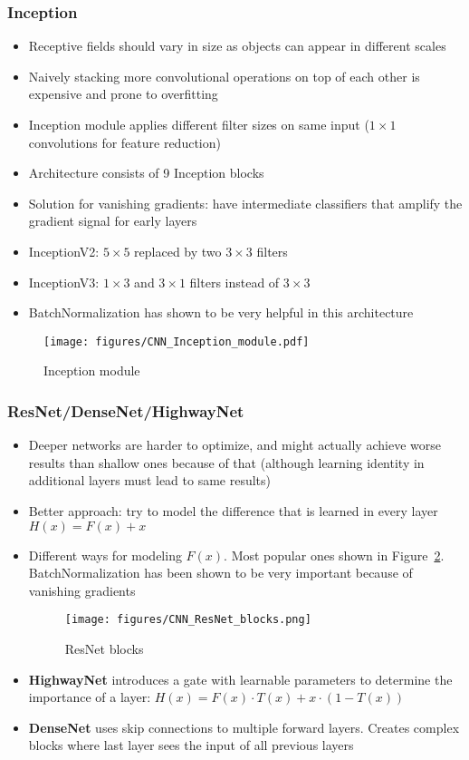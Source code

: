 \subsubsection{Inception}
\begin{itemize}
	\item Receptive fields should vary in size as objects can appear in different scales
	\item Naively stacking more convolutional operations on top of each other is expensive and prone to overfitting
	\item Inception module applies different filter sizes on same input ($1\times 1$ convolutions for feature reduction)
	\item Architecture consists of 9 Inception blocks
	\item Solution for vanishing gradients: have intermediate classifiers that amplify the gradient signal for early layers
	\item InceptionV2: $5\times 5$ replaced by two $3\times 3$ filters
	\item InceptionV3: $1\times 3$ and $3\times 1$ filters instead of $3\times 3$
	\item BatchNormalization has shown to be very helpful in this architecture
\end{itemize}
\begin{figure}[ht!]
	\centering
	\texttt{[image: figures/CNN\_Inception\_module.pdf]}
	\caption{Inception module}
	\label{fig:CNN_Inception_module}
\end{figure}
\subsubsection{ResNet/DenseNet/HighwayNet}
\begin{itemize}
	\item Deeper networks are harder to optimize, and might actually achieve worse results than shallow ones because of that (although learning identity in additional layers must lead to same results)
	\item Better approach: try to model the difference that is learned in every layer $H(x) = F(x) + x$
	\item Different ways for modeling $F(x)$. Most popular ones shown in Figure~\ref{fig:CNN_ResNet_blocks}. BatchNormalization has been shown to be very important because of vanishing gradients
	\begin{figure}[ht!]
		\centering
		\texttt{[image: figures/CNN\_ResNet\_blocks.png]}
		\caption{ResNet blocks}
		\label{fig:CNN_ResNet_blocks}
	\end{figure}
	\item \textbf{HighwayNet} introduces a gate with learnable parameters to determine the importance of a layer: $H(x) = F(x) \cdot T(x) + x \cdot \left(1 - T\left(x\right)\right)$
	\item \textbf{DenseNet} uses skip connections to multiple forward layers. Creates complex blocks where last layer sees the input of all previous layers
\end{itemize}
